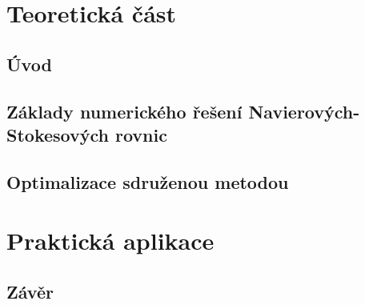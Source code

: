\documentclass[twoside]{ctuthesis}
\theoremstyle{plainit}
\begin{document}
\maketitle

\setcounter{page}{-1}
\part{Teoretická část}
\chapter{Úvod}


\chapter{Základy numerického řešení Navierových-Stokesových rovnic}


\chapter{Optimalizace sdruženou metodou}


\part{Praktická aplikace}



\chapter{Závěr}

 










\appendix

\printnomenclature




\newpage
\end{document}
